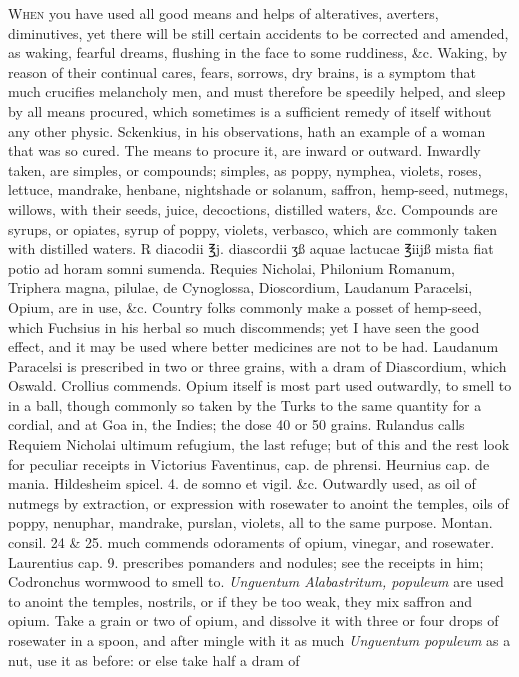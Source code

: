 \lettrine{W}{hen} you have used all good means and helps of alteratives, averters,
diminutives, yet there will be still certain accidents to be corrected
and amended, as waking, fearful dreams, flushing in the face to some
ruddiness, \&c.
Waking, by reason of their continual cares, fears, sorrows, dry brains,
is a symptom that much crucifies melancholy men, and must therefore be
speedily helped, and sleep by all means procured, which sometimes is a
sufficient remedy of itself without any other physic. Sckenkius,
in his observations, hath an example of a woman that was so cured. The
means to procure it, are inward or outward. Inwardly taken, are
simples, or compounds; simples, as poppy, nymphea, violets, roses,
lettuce, mandrake, henbane, nightshade or solanum, saffron, hemp-seed,
nutmegs, willows, with their seeds, juice, decoctions, distilled
waters, \&c. Compounds are syrups, or opiates, syrup of poppy, violets,
verbasco, which are commonly taken with distilled waters.
℞ diacodii ℥j. diascordii ʒß aquae lactucae ℥iijß mista fiat potio ad
horam somni sumenda.
Requies Nicholai, Philonium Romanum, Triphera magna, pilulae, de
Cynoglossa, Dioscordium, Laudanum Paracelsi, Opium, are in use, \&c.
Country folks commonly make a posset of hemp-seed, which Fuchsius in
his herbal so much discommends; yet I have seen the good effect, and it
may be used where better medicines are not to be had.
Laudanum Paracelsi is prescribed in two or three grains, with a dram of
Diascordium, which Oswald. Crollius commends. Opium itself is most part
used outwardly, to smell to in a ball, though commonly so taken by the
Turks to the same quantity for a cordial, and at Goa in, the
Indies; the dose 40 or 50 grains.
Rulandus calls Requiem Nicholai ultimum refugium, the last refuge; but
of this and the rest look for peculiar receipts in Victorius
Faventinus, cap. de phrensi. Heurnius cap. de mania. Hildesheim spicel.
4. de somno et vigil. \&c. Outwardly used, as oil of nutmegs by
extraction, or expression with rosewater to anoint the temples, oils of
poppy, nenuphar, mandrake, purslan, violets, all to the same purpose.
Montan. consil. 24 \& 25. much commends odoraments of opium, vinegar,
and rosewater. Laurentius cap. 9. prescribes pomanders and nodules; see
the receipts in him; Codronchus wormwood to smell to.
\emph{Unguentum Alabastritum, populeum} are used to anoint the temples,
nostrils, or if they be too weak, they mix saffron and opium. Take a
grain or two of opium, and dissolve it with three or four drops of
rosewater in a spoon, and after mingle with it as much \emph{Unguentum
populeum} as a nut, use it as before: or else take half a dram of
